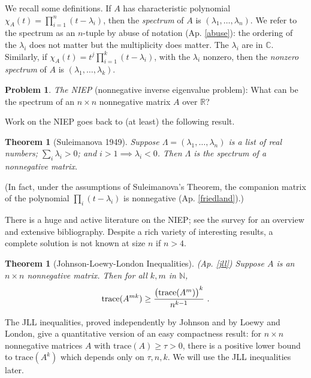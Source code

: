 \documentclass{amsart}
\newcommand{\si}{\index}
\newcommand{\ai}{\index[authors]}
\newtheorem{thm}[equation]{Theorem}
\theoremstyle{definition}
\newtheorem{prob}[equation]{Problem}
\theoremstyle{definition}
\newcommand{\apr}{(Ap. \ref}
\newcommand{\R}{\mathbb R}
\newcommand{\C}{\mathbb C}
\newcommand{\N}{\mathbb N}
\newcommand{\tr}{\textnormal{trace}}
\numberwithin{equation}{subsection}
\begin{document}
We recall some definitions.
If $A$ has characteristic polynomial
$\chi_A(t)=\prod_{i=1}^n(t-\lambda_i)$, then the {\it spectrum} of $A$ is
$(\lambda_1, \dots , \lambda_n)$. We refer to the spectrum as an
$n$-tuple by
abuse of notation \apr{abuse}): the ordering of the $\lambda_i$
does not matter but the multiplicity does matter. The $\lambda_i$ are in $\C$.
Similarly, if $\chi_A(t)= t^j\prod_{i=1}^k(t-\lambda_i)$, with the
$\lambda_i$ nonzero, then the {\it nonzero\si{nonzero spectrum} spectrum} of $A$ is
$(\lambda_1, \dots , \lambda_k)$.

\begin{prob}
{\it The NIEP} (nonnegative inverse eigenvalue problem):
What can be the spectrum of an $n\times n$
nonnegative matrix $A$ over $\R$?
\end{prob}

Work on the NIEP goes back to (at least)
the following result.
\begin{thm}[Suleimanova 1949]\cite{suleimanova}
Suppose $\Lambda = (\lambda_1, \dots , \lambda_n)$ is a list of
real numbers; $\sum_i \lambda_i >0$; and $i>1 \implies \lambda_i <0$.
Then $\Lambda$ is the spectrum of a nonnegative matrix.
\end{thm}
(In fact, under the assumptions of Suleimanova's Theorem,
the companion matrix of the polynomial $\prod_i(t-\lambda_i)$
is nonnegative  \apr{friedland}).)

There is a huge and active
literature  on the NIEP; see the  survey
\cite{NIEP2018} for an overview and extensive bibliography.
Despite a rich variety of interesting results,
a complete solution is not known at size $n$ if $n > 4$.


\begin{thm} [Johnson-Loewy-London Inequalities] \apr{jll})
Suppose $A$ is an $n\times n$  nonnegative matrix.
Then for all $k,m$ in $\N$,
\[
\tr (A^{mk})\geq \frac{\big(\tr (A^m)\big)^k}{n^{k-1}} \ .
\]
\end{thm}

The JLL inequalities, proved independently by Johnson\ai{Johnson, Charles} and by Loewy and
London,
give a
quantitative version of an easy compactness result:
for $n\times n$
nonnegative matrices $A$ with $\text{trace}(A)\geq \tau >0$,
there is a positive lower bound to
$\text{trace}(A^k)$ which depends only on $\tau , n, k$.
We will use the JLL inequalities later.
\end{document}

